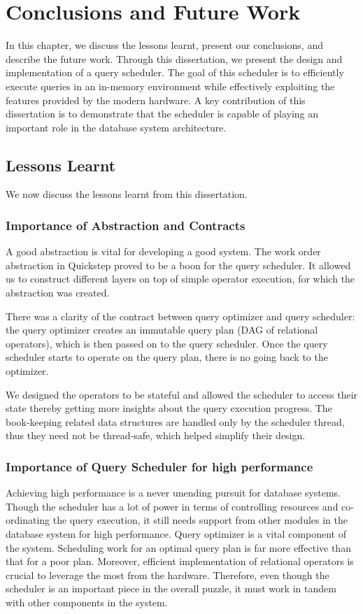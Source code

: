\chapter{Conclusions and Future Work}
In this chapter, we discuss the lessons learnt, present our conclusions, and describe the future work.
Through this dissertation, we present the design and implementation of a query scheduler.
The goal of this scheduler is to efficiently execute queries in an in-memory environment while effectively exploiting the features provided by the modern hardware. 
A key contribution of this dissertation is to demonstrate that the scheduler is capable of playing an important role in the database system architecture.

\section{Lessons Learnt}
We now discuss the lessons learnt from this dissertation.

\subsection{Importance of Abstraction and Contracts}
A good abstraction is vital for developing a good system. 
The work order abstraction in Quickstep proved to be a boon for the query scheduler. 
It allowed us to construct different layers on top of simple operator execution, for which the  abstraction was created. 

There was a clarity of the contract between query optimizer and query scheduler: the query optimizer creates an immutable query plan (DAG of relational operators), which is then passed on to the query scheduler. 
Once the query scheduler starts to operate on the query plan, there is no going back to the optimizer. 

We designed the operators to be stateful and allowed the scheduler to access their state thereby getting more insights about the query execution progress.
The book-keeping related data structures are handled only by the scheduler thread, thus they need not be thread-safe, which helped simplify their design. 

\subsection{Importance of Query Scheduler for high performance}
Achieving high performance is a never unending pursuit for database systems. 
Though the scheduler has a lot of power in terms of controlling resources and co-ordinating the query execution, it still needs support from other modules in the database system for high performance.
Query optimizer is a vital component of the system. 
Scheduling work for an optimal query plan is far more effective than that for a poor plan. 
Moreover, efficient implementation of relational operators is crucial to leverage the most from the hardware. 
Therefore, even though the scheduler is an important piece in the overall puzzle, it must work in tandem with other components in the system. 

